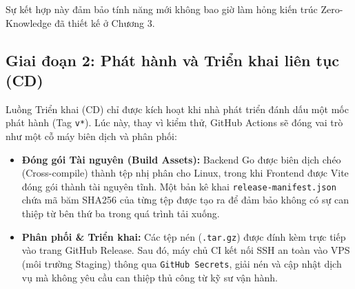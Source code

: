 Sự kết hợp này đảm bảo tính năng mới không bao giờ làm hỏng kiến trúc Zero-Knowledge đã thiết kế ở Chương 3.

\subsection[Phát hành và Triển khai liên tục (CD)]{Giai đoạn 2: Phát hành và Triển khai liên tục (CD)}
Luồng Triển khai (CD) chỉ được kích hoạt khi nhà phát triển đánh dấu một mốc phát hành (Tag \texttt{v*}). Lúc này, thay vì kiểm thử, GitHub Actions sẽ đóng vai trò như một cỗ máy biên dịch và phân phối:
\begin{itemize}
    \item \textbf{Đóng gói Tài nguyên (Build Assets):} Backend Go được biên dịch chéo (Cross-compile) thành tệp nhị phân cho Linux, trong khi Frontend được Vite đóng gói thành tài nguyên tĩnh. Một bản kê khai \texttt{release-manifest.json} chứa mã băm SHA256 của từng tệp được tạo ra để đảm bảo không có sự can thiệp từ bên thứ ba trong quá trình tải xuống.
    \item \textbf{Phân phối \& Triển khai:} Các tệp nén (\texttt{.tar.gz}) được đính kèm trực tiếp vào trang GitHub Release. Sau đó, máy chủ CI kết nối SSH an toàn vào VPS (môi trường Staging) thông qua \texttt{GitHub Secrets}, giải nén và cập nhật dịch vụ mà không yêu cầu can thiệp thủ công từ kỹ sư vận hành.
\end{itemize}